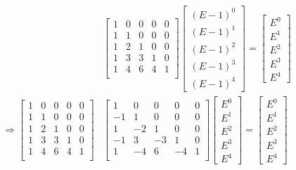 \documentclass{article}
\renewcommand\({\left(}
\renewcommand\){\right)}
\begin{document}
\begin{align*}
    &\begin{bmatrix}
 1 & 0 & 0 & 0 & 0 \\
 1 & 1 & 0 & 0 & 0 \\
 1 & 2 & 1 & 0 & 0 \\
 1 & 3 & 3 & 1 & 0 \\
 1 & 4 & 6 & 4 & 1 \\
    \end{bmatrix}
    \begin{bmatrix}(E-1)^0\\(E-1)^1\\(E-1)^2\\(E-1)^3\\(E-1)^4\end{bmatrix}=\begin{bmatrix}E^0\\E^1\\E^2\\E^3\\E^4\end{bmatrix}\\
    \Rightarrow\begin{bmatrix}
 1 & 0 & 0 & 0 & 0 \\
 1 & 1 & 0 & 0 & 0 \\
 1 & 2 & 1 & 0 & 0 \\
 1 & 3 & 3 & 1 & 0 \\
 1 & 4 & 6 & 4 & 1 \\
    \end{bmatrix}
    &\begin{bmatrix}
 1 & 0 & 0 & 0 & 0 \\
 -1 & 1 & 0 & 0 & 0 \\
 1 & -2 & 1 & 0 & 0 \\
 -1 & 3 & -3 & 1 & 0 \\
 1 & -4 & 6 & -4 & 1 \\
    \end{bmatrix}
    \begin{bmatrix}E^0\\E^1\\E^2\\E^3\\E^4\end{bmatrix}=\begin{bmatrix}E^0\\E^1\\E^2\\E^3\\E^4\end{bmatrix}\\

\end{align*}
\end{document}
